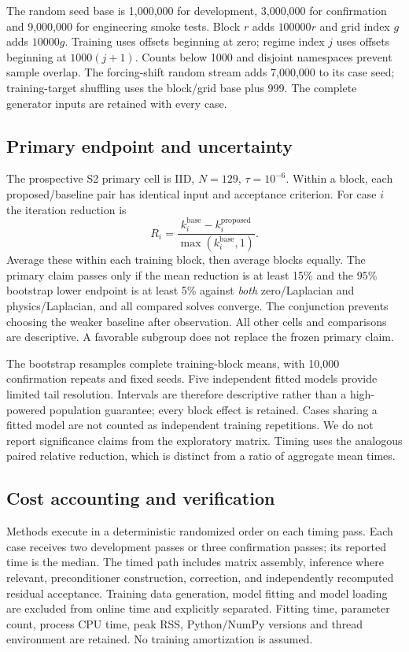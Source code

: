 The random seed base is 1,000,000 for development, 3,000,000 for confirmation and 9,000,000 for engineering smoke tests. Block $r$ adds $100000r$ and grid index $g$ adds $10000g$. Training uses offsets beginning at zero; regime index $j$ uses offsets beginning at $1000(j+1)$. Counts below 1000 and disjoint namespaces prevent sample overlap. The forcing-shift random stream adds 7,000,000 to its case seed; training-target shuffling uses the block/grid base plus 999. The complete generator inputs are retained with every case.

\subsection{Primary endpoint and uncertainty}
The prospective S2 primary cell is IID, $N=129$, $\tau=10^{-6}$. Within a block, each proposed/baseline pair has identical input and acceptance criterion. For case $i$ the iteration reduction is
\begin{equation}
 R_i=\frac{k_i^{\mathrm{base}}-k_i^{\mathrm{proposed}}}{\max(k_i^{\mathrm{base}},1)}.
\end{equation}
Average these within each training block, then average blocks equally. The primary claim passes only if the mean reduction is at least 15\% and the 95\% bootstrap lower endpoint is at least 5\% against \emph{both} zero/Laplacian and physics/Laplacian, and all compared solves converge. The conjunction prevents choosing the weaker baseline after observation. All other cells and comparisons are descriptive. A favorable subgroup does not replace the frozen primary claim.

The bootstrap resamples complete training-block means, with 10,000 confirmation repeats and fixed seeds. Five independent fitted models provide limited tail resolution. Intervals are therefore descriptive rather than a high-powered population guarantee; every block effect is retained. Cases sharing a fitted model are not counted as independent training repetitions. We do not report significance claims from the exploratory matrix. Timing uses the analogous paired relative reduction, which is distinct from a ratio of aggregate mean times.

\subsection{Cost accounting and verification}
Methods execute in a deterministic randomized order on each timing pass. Each case receives two development passes or three confirmation passes; its reported time is the median. The timed path includes matrix assembly, inference where relevant, preconditioner construction, correction, and independently recomputed residual acceptance. Training data generation, model fitting and model loading are excluded from online time and explicitly separated. Fitting time, parameter count, process CPU time, peak RSS, Python/NumPy versions and thread environment are retained. No training amortization is assumed.

